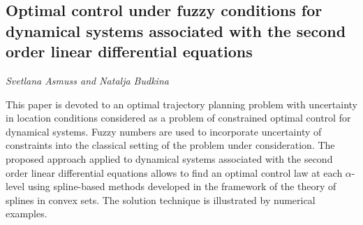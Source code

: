 \documentclass[../booklet.tex]{subfiles}
\begin{document}
\subsection[Optimal control under fuzzy conditions for dynamical systems associated with the second order linear differential equations. {\it Svetlana Asmuss and Natalja Budkina}]{Optimal control under fuzzy conditions for dynamical systems associated with the second order linear differential equations}
 

\begin{center}
  {\it Svetlana Asmuss and Natalja Budkina}
\end{center}

\vskip 0.8cm


This paper is devoted to an optimal trajectory planning problem with uncertainty in location conditions considered as a problem of constrained optimal control for dynamical systems. Fuzzy numbers are used to incorporate uncertainty of constraints into the classical setting of the problem under consideration. The proposed approach applied to dynamical systems associated with the second order linear differential equations allows to find an optimal control law at each $\alpha$-level using spline-based methods developed in the framework of the theory of splines in convex sets. The solution technique is illustrated by numerical examples. 

\end{document}
